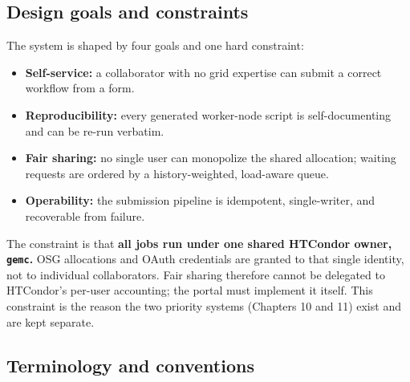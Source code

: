 \subsection{Design goals and constraints}

The system is shaped by four goals and one hard constraint:

\begin{itemize}
  \item \textbf{Self-service:} a collaborator with no grid expertise can submit a correct workflow from a form.
  \item \textbf{Reproducibility:} every generated worker-node script is self-documenting and can be re-run verbatim.
  \item \textbf{Fair sharing:} no single user can monopolize the shared allocation; waiting requests are ordered by a history-weighted, load-aware queue.
  \item \textbf{Operability:} the submission pipeline is idempotent, single-writer, and recoverable from failure.
\end{itemize}

The constraint is that \textbf{all jobs run under one shared HTCondor owner, \texttt{gemc}.} OSG allocations and OAuth credentials are granted to that single identity, not to individual collaborators. Fair sharing therefore cannot be delegated to HTCondor's per-user accounting; the portal must implement it itself. This constraint is the reason the two priority systems (Chapters 10 and 11) exist and are kept separate.

\subsection{Terminology and conventions}

